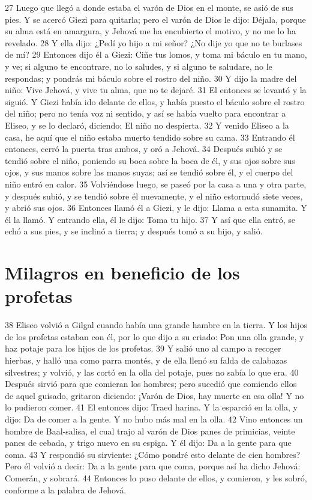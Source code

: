 27 Luego que llegó a donde estaba el varón de Dios en el monte, se asió de sus pies. Y se acercó Giezi para quitarla; pero el varón de Dios le dijo: Déjala, porque su alma está en amargura, y Jehová me ha encubierto el motivo, y no me lo ha revelado.
28 Y ella dijo: ¿Pedí yo hijo a mi señor? ¿No dije yo que no te burlases de mí?
29 Entonces dijo él a Giezi: Ciñe tus lomos, y toma mi báculo en tu mano, y ve; si alguno te encontrare, no lo saludes, y si alguno te saludare, no le respondas; y pondrás mi báculo sobre el rostro del niño.
30 Y dijo la madre del niño: Vive Jehová, y vive tu alma, que no te dejaré.
31 El entonces se levantó y la siguió. Y Giezi había ido delante de ellos, y había puesto el báculo sobre el rostro del niño; pero no tenía voz ni sentido, y así se había vuelto para encontrar a Eliseo, y se lo declaró, diciendo: El niño no despierta.
32 Y venido Eliseo a la casa, he aquí que el niño estaba muerto tendido sobre su cama.
33 Entrando él entonces, cerró la puerta tras ambos, y oró a Jehová.
34 Después subió y se tendió sobre el niño, poniendo su boca sobre la boca de él, y sus ojos sobre sus ojos, y sus manos sobre las manos suyas; así se tendió sobre él, y el cuerpo del niño entró en calor.
35 Volviéndose luego, se paseó por la casa a una y otra parte, y después subió, y se tendió sobre él nuevamente, y el niño estornudó siete veces, y abrió sus ojos.
36 Entonces llamó él a Giezi, y le dijo: Llama a esta sunamita. Y él la llamó. Y entrando ella, él le dijo: Toma tu hijo.
37 Y así que ella entró, se echó a sus pies, y se inclinó a tierra; y después tomó a su hijo, y salió.
\section*{Milagros en beneficio de los profetas}

38 Eliseo volvió a Gilgal cuando había una grande hambre en la tierra. Y los hijos de los profetas estaban con él, por lo que dijo a su criado: Pon una olla grande, y haz potaje para los hijos de los profetas.
39 Y salió uno al campo a recoger hierbas, y halló una como parra montés, y de ella llenó su falda de calabazas silvestres; y volvió, y las cortó en la olla del potaje, pues no sabía lo que era.
40 Después sirvió para que comieran los hombres; pero sucedió que comiendo ellos de aquel guisado, gritaron diciendo: ¡Varón de Dios, hay muerte en esa olla! Y no lo pudieron comer.
41 El entonces dijo: Traed harina. Y la esparció en la olla, y dijo: Da de comer a la gente. Y no hubo más mal en la olla.
42 Vino entonces un hombre de Baal-salisa, el cual trajo al varón de Dios panes de primicias, veinte panes de cebada, y trigo nuevo en su espiga. Y él dijo: Da a la gente para que coma.
43 Y respondió su sirviente: ¿Cómo pondré esto delante de cien hombres? Pero él volvió a decir: Da a la gente para que coma, porque así ha dicho Jehová: Comerán, y sobrará.
44 Entonces lo puso delante de ellos, y comieron, y les sobró, conforme a la palabra de Jehová.

